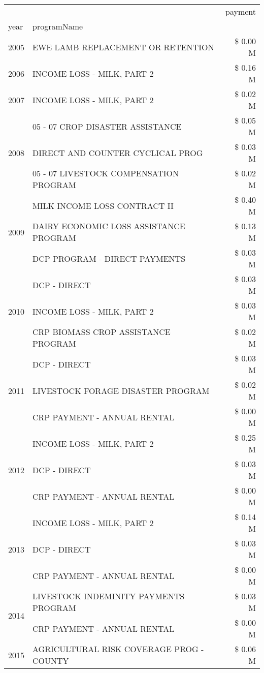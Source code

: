 \begin{tabular}{llr}
\toprule
 &  & payment \\
year & programName &  \\
\midrule
2005 & EWE LAMB REPLACEMENT OR RETENTION & \$ 0.00 M \\
\cline{1-3}
2006 & INCOME LOSS - MILK, PART 2 & \$ 0.16 M \\
\cline{1-3}
2007 & INCOME LOSS - MILK, PART 2 & \$ 0.02 M \\
\cline{1-3}
\multirow[t]{3}{*}{2008} & 05 - 07 CROP DISASTER ASSISTANCE & \$ 0.05 M \\
 & DIRECT AND COUNTER CYCLICAL PROG & \$ 0.03 M \\
 & 05 - 07 LIVESTOCK COMPENSATION PROGRAM & \$ 0.02 M \\
\cline{1-3}
\multirow[t]{3}{*}{2009} & MILK INCOME LOSS CONTRACT II & \$ 0.40 M \\
 & DAIRY ECONOMIC LOSS ASSISTANCE PROGRAM & \$ 0.13 M \\
 & DCP PROGRAM - DIRECT PAYMENTS & \$ 0.03 M \\
\cline{1-3}
\multirow[t]{3}{*}{2010} & DCP - DIRECT & \$ 0.03 M \\
 & INCOME LOSS - MILK, PART 2 & \$ 0.03 M \\
 & CRP BIOMASS CROP ASSISTANCE PROGRAM & \$ 0.02 M \\
\cline{1-3}
\multirow[t]{3}{*}{2011} & DCP - DIRECT & \$ 0.03 M \\
 & LIVESTOCK FORAGE DISASTER PROGRAM & \$ 0.02 M \\
 & CRP PAYMENT - ANNUAL RENTAL & \$ 0.00 M \\
\cline{1-3}
\multirow[t]{3}{*}{2012} & INCOME LOSS - MILK, PART 2 & \$ 0.25 M \\
 & DCP - DIRECT & \$ 0.03 M \\
 & CRP PAYMENT - ANNUAL RENTAL & \$ 0.00 M \\
\cline{1-3}
\multirow[t]{3}{*}{2013} & INCOME LOSS - MILK, PART 2 & \$ 0.14 M \\
 & DCP - DIRECT & \$ 0.03 M \\
 & CRP PAYMENT - ANNUAL RENTAL & \$ 0.00 M \\
\cline{1-3}
\multirow[t]{2}{*}{2014} & LIVESTOCK INDEMINITY PAYMENTS PROGRAM & \$ 0.03 M \\
 & CRP PAYMENT - ANNUAL RENTAL & \$ 0.00 M \\
\cline{1-3}
\multirow[t]{3}{*}{2015} & AGRICULTURAL RISK COVERAGE PROG - COUNTY & \$ 0.06 M \\

\end{tabular}
